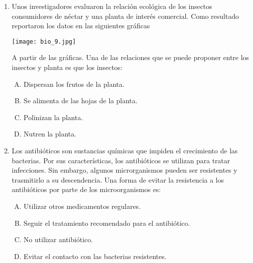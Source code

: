 \begin{enumerate}
\newpage
\item Unos   investigadores  evaluaron  la relación ecológica de los insectos consumidores de néctar y una planta de interés comercial.  Como resultado  reportaron los datos  en las siguientes gráficas \label{bio-15}
\begin{center}
\texttt{[image: bio\_9.jpg]} 
\end{center}
A partir   de las  gráficas.  Una de las  relaciones  que  se puede  proponer  entre los insectos y planta  es   que los insectos:
\begin{enumerate}[(A)]
\item Dispersan los frutos de la planta.
\item Se alimenta de las hojas de la planta.
\item Polinizan la  planta.
\item Nutren la   planta.
\end{enumerate}


\newpage
\item Los  antibióticos   son sustancias  químicas  que impiden  el  crecimiento de   las  bacterias.  Por  sus  características, los  antibióticos  se   utilizan   para tratar   infecciones.  Sin  embargo, algunos  microrganismos  pueden   ser  resistentes  y trasmitirlo   a  su descendencia.  Una  forma  de evitar  la  resistencia a los antibióticos   por parte   de los  microorganismos   es: \label{bio-16}


\begin{enumerate}[(A)]
\item Utilizar  otros  medicamentos  regulares.
\item Seguir  el tratamiento  recomendado para  el antibiótico.
\item No utilizar  antibiótico.
\item Evitar  el contacto  con las bacterias resistentes.
\end{enumerate}



\end{enumerate}
